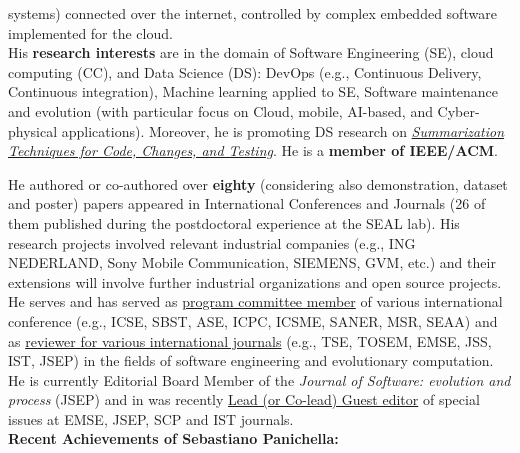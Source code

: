 \documentclass[10pt]{article}
\begin{document}
systems) connected over the internet, controlled by complex embedded software implemented for the cloud.\\
His  \textbf{research interests} are in the domain of Software Engineering (SE), cloud computing (CC), and Data Science (DS): DevOps (e.g., Continuous Delivery, Continuous integration), Machine learning applied to SE, Software maintenance and evolution (with particular focus on Cloud, mobile, AI-based, and Cyber-physical applications). Moreover, he is promoting DS research on \href{https://doi.org/10.1109/VST.2018.8327148}{\textit{Summarization Techniques for Code, Changes, and Testing}}. He is a \textbf{member of IEEE/ACM}. 
\vspace{1mm}

He authored or co-authored over \textbf{eighty} (considering also demonstration, dataset 
  and poster) papers appeared in International Conferences and Journals (26 of them published during the postdoctoral experience at the SEAL lab). His research projects involved relevant industrial companies (e.g., ING NEDERLAND, Sony Mobile Communication, SIEMENS, GVM, etc.) and their extensions will involve further industrial organizations and open source projects. He serves and has served as \href{https://spanichella.github.io/\#services}{program committee member} of various international conference (e.g., ICSE, SBST, ASE, ICPC, ICSME, SANER, MSR, SEAA) and as \href{https://spanichella.github.io/\#services}{reviewer for various international journals} (e.g., TSE, TOSEM, EMSE, JSS, IST, JSEP) in the fields of software engineering and evolutionary computation. He is currently Editorial Board Member of the \textit{Journal of Software: evolution and process} (JSEP) and in was recently \href{https://spanichella.github.io/\#services}{Lead (or Co-lead) Guest editor} of special issues at EMSE, JSEP, SCP and IST journals.\\


\textbf{Recent Achievements of Sebastiano Panichella:}
\end{document}

